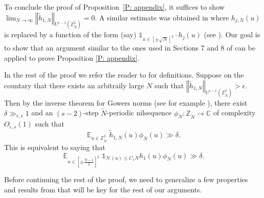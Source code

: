 \documentclass[11pt]{amsart}
\theoremstyle{definition}
\DeclareMathOperator*{\E}{\mathbb{E}}
\newcommand{\C}{{\mathbb C}}
\newcommand{\NN}{{\mathcal N}}
\newcommand{\Z}{{\mathbb Z}}
\newcommand{\e}{\epsilon}
\newcommand{\norm}[1]{\left\Vert #1\right\Vert}
\begin{document}
To conclude the proof of Proposition~\ref{P: appendix}, it suffices to show $\lim_{N\to\infty}\norm{\tilde{h}_{1,N}}_{U^{s-1}(\Z_{\tilde{N}}^{2})}=0$.
A similar estimate was obtained in \cite{S23} where $h_{j,N}(u)$ is replaced by a function of the form (say) $\mathds{1}_{u\in[\pm \sqrt{N}]^{2}}\cdot h_{j}(u)$ (see \cite[Theorem~1.12]{S23}). Our goal is to show that an argument similar to the ones used in Sections 7 and 8 of \cite{S23} can be applied to prove Proposition \ref{P: appendix}.


In the rest of the proof we refer the reader to \cite{S23} for definitions.
Suppose on the countary that there exists an arbitraily large $N$ such that 
$\norm{\tilde{h}_{1,N}}_{U^{s-1}(\Z_{\tilde{N}}^{2})}>\e$. 
Then by the inverse theorem for Gowers norms (see for example \cite[Theorem~8.5]{S23}), there exist $\delta\gg_{\e,s} 1$ and an $(s-2)$-step $\tilde{N}$-periodic nilsequence $\phi_{N}\colon \Z_{\tilde{N}}\to\C$ of complexity $O_{\e,s}(1)$ such that 
$$\E_{u\in\Z_{\tilde{N}}^{2}}\tilde{h}_{1,N}(u)\phi_{N}(u)\gg \delta.$$
This is equivalent to saying that 
$$\E_{u\in\left[\pm\frac{\tilde{N}-1}{2}\right]^{2}}\mathds{1}_{\NN(u)\leq C_1N}h_{1}(u)\phi_{N}(u)\gg \delta.$$

Before continuing the rest of the proof, we  need to generalize a few properties and results from \cite{S23} that will be key for the rest of our arguments.
\end{document}
